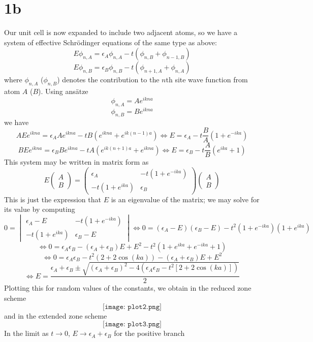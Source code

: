 \documentclass{article}
\begin{document}
\section*{1b}
Our unit cell is now expanded to include two adjacent atoms, so we have a system of effective Schr\"odinger equations of the same
type as above:
\[
  E\phi_{n,A}=\epsilon_{A} \phi_{n,A}-t(\phi_{n,B}+\phi_{n-1,B})
\]
\[
  E\phi_{n,B}=\epsilon_{B}\phi_{n,B}-t(\phi_{n+1,A}+\phi_{n,A})
\]
where $\phi_{n,A}$ ($\phi_{n,B}$) denotes the contribution to the $n$th site wave function from atom $A$ ($B$).
Using ans\"atze
\[
  \phi_{n,A}=Ae^{ikna}
\]
\[
  \phi_{n,B}=Be^{ikna}
\]
we have
\[
  AEe^{ikna}=\epsilon_{A} Ae^{ikna}-tB(e^{ikna}+e^{ik(n-1)a})
  \Leftrightarrow E=\epsilon_{A}-t\frac{B}{A}(1+e^{-ika})
\]
\[
  BEe^{ikna}=\epsilon_{B} Be^{ikna}-tA(e^{ik(n+1)a}+e^{ikna})
  \Leftrightarrow E=\epsilon_{B}-t\frac{A}{B}(e^{ika}+1)
\]
This system may be written in matrix form as
\[
  E
  \begin{pmatrix}
    A \\
    B
  \end{pmatrix}
  =
  \begin{pmatrix}
    \epsilon_{A} & -t(1+e^{-ika}) \\
    -t(1+e^{ika}) & \epsilon_{B}
  \end{pmatrix}
  \begin{pmatrix}
    A \\
    B
  \end{pmatrix}
\]
This is just the expression that $E$ is an eigenvalue of the matrix; we may solve for its value by computing
\[
  0=
  \begin{vmatrix}
    \epsilon_{A}-E & -t(1+e^{-ika}) \\
    -t(1+e^{ika}) & \epsilon_{B}-E
  \end{vmatrix}
  \Leftrightarrow 0=(\epsilon_{A}-E)(\epsilon_{B}-E)-t^{2}(1+e^{-ika})(1+e^{ika})
\]
\[
  \Leftrightarrow 0= \epsilon_{A}\epsilon_{B}-(\epsilon_{A}+\epsilon_{B})E+E^{2}-t^{2}(1+e^{ika}+e^{-ika}+1)
\]
\[
  \Leftrightarrow 0=\epsilon_{A}\epsilon_{B}-t^{2}(2+2\cos(ka))-(\epsilon_{A}+\epsilon_{B})E+E^{2}
\]
\[
  \Leftrightarrow E=\frac{\epsilon_{A}+\epsilon_{B}\pm\sqrt{(\epsilon_{A}+\epsilon_{B})^{2}-4(\epsilon_{A}\epsilon_{B}-t^{2}[2+2\cos(ka)])}}
  {2}
\]
Plotting this for random values of the constants, we obtain in the reduced zone scheme
\[
  \texttt{[image: plot2.png]}
\]
and in the extended zone scheme
\[
  \texttt{[image: plot3.png]}
\]
In the limit as $t\to 0$, $E\to \epsilon_{A}+\epsilon_{B}$ for the positive branch
\end{document}
